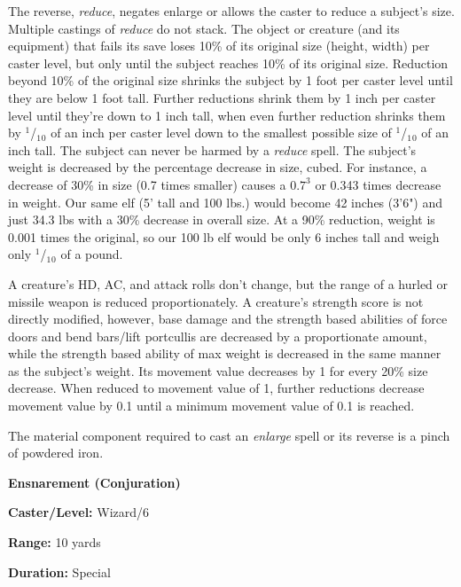 \begin{multicols}{2}
The reverse, \textit{reduce}, negates enlarge or allows the caster to reduce a subject's size.  Multiple castings of \textit{reduce} do not stack.  The object or creature (and its equipment) that fails its save loses 10\% of its original size (height, width) per caster level, but only until the subject reaches 10\% of its original size.  Reduction beyond 10\% of the original size shrinks the subject by 1 foot per caster level until they are below 1 foot tall.  Further reductions shrink them by 1 inch per caster level until they're down to 1 inch tall, when even further reduction shrinks them by $^1$/$_1$$_0$ of an inch per caster level down to the smallest possible size of $^1$/$_1$$_0$ of an inch tall.  The subject can never be harmed by a \textit{reduce} spell.  The subject's weight is decreased by the percentage decrease in size, cubed.  For instance, a decrease of 30\% in size (0.7 times smaller) causes a $0.7^3$ or 0.343 times decrease in weight.  Our same elf (5' tall and 100 lbs.) would become 42 inches (3'6") and just 34.3 lbs with a 30\% decrease in overall size.  At a 90\% reduction, weight is 0.001 times the original, so our 100 lb elf would be only 6 inches tall and weigh only $^1$/$_1$$_0$ of a pound.  

A creature's HD, AC, and attack rolls don't change, but the range of a hurled or missile weapon is reduced proportionately.  A creature's strength score is not directly modified, however, base damage and the strength based abilities of force doors and bend bars/lift portcullis are decreased by a proportionate amount, while the strength based ability of max weight is decreased in the same manner as the subject's weight.  Its movement value decreases by 1 for every 20\% size decrease.  When reduced to movement value of 1, further reductions decrease movement value by 0.1 until a minimum movement value of 0.1 is reached.

The material component required to cast an \textit{enlarge} spell or its reverse is a pinch of powdered iron.

\vspace{1em}

\noindent
\begin{minipage}{\columnwidth}

\noindent \textbf{Ensnarement (Conjuration)}

\noindent \textbf{Caster/Level:} Wizard/6

\noindent \textbf{Range:} 10 yards

\noindent \textbf{Duration:} Special


\end{minipage}
\end{multicols}
